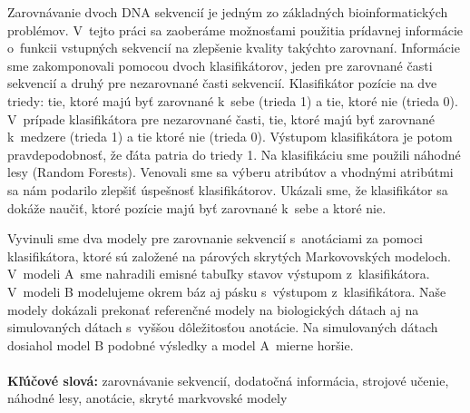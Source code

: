 Zarovnávanie dvoch DNA sekvencií je jedným zo základných
bioinformatických problémov. V~tejto práci sa zaoberáme možnosťami použitia prídavnej informácie o~funkcii vstupných sekvencií na zlepšenie kvality takýchto zarovnaní.
Informácie sme zakomponovali pomocou dvoch klasifikátorov, jeden pre zarovnané časti sekvencií a druhý pre nezarovnané časti sekvencií.
Klasifikátor pozície na dve triedy: tie, ktoré majú byť zarovnané k~sebe (trieda 1) a tie, ktoré nie (trieda 0). V~prípade klasifikátora pre nezarovnané časti, tie, ktoré majú byť zarovnané k~medzere (trieda 1) a tie ktoré nie (trieda 0). Výstupom klasifikátora je potom pravdepodobnosť, že ďáta patria do triedy 1. Na klasifikáciu sme použili náhodné lesy (Random Forests). Venovali sme sa výberu atribútov a vhodnými atribútmi sa nám podarilo zlepšiť úspešnosť klasifikátorov. Ukázali sme, že klasifikátor sa dokáže naučiť, ktoré pozície majú byť zarovnané k~sebe a ktoré nie.

Vyvinuli sme dva modely pre zarovnanie sekvencií s~anotáciami za pomoci klasifikátora, ktoré sú založené na párových skrytých Markovovských modeloch.
V~modeli A~sme nahradili emisné tabuľky stavov výstupom z~klasifikátora.
V~modeli B modelujeme okrem báz aj pásku s~výstupom z~klasifikátora.
Naše modely dokázali prekonať referenčné modely na biologických dátach aj na simulovaných dátach s~vyššou dôležitosťou anotácie. Na simulovaných dátach dosiahol model B podobné výsledky a model A~mierne horšie.
\\ \\
{\bf Kľúčové slová:} zarovnávanie sekvencií, dodatočná informácia, strojové učenie, náhodné lesy, anotácie, skryté markvovské modely
